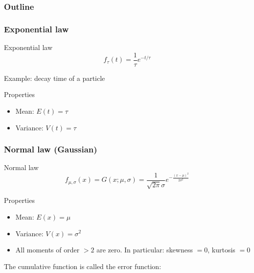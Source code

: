 \documentclass[9pt]{beamer}
\newif\ifmynote
\newcommand\mynote[1]{%
\ifmynote \textbf{#1} \else \fi
}
\begin{document}
\begin{frame}
 \frametitle{Outline}
 
 \tableofcontents[current]
\end{frame}

\begin{frame}
 \frametitle{Exponential law}
 
 \mynote{Écrire au tableau}
 
 \begin{block}{Exponential law}
  $$f_\tau (t) = \frac{1}{\tau} e^{-t/\tau}$$
 \end{block}
 
 Example: decay time of a particle
 
 \begin{block}{Properties}
  \begin{itemize}
   \item Mean: $E(t) = \tau$
   \item Variance: $V(t) = \tau$
  \end{itemize}

 \end{block}


\end{frame}

\begin{frame}
 \frametitle{Normal law (Gaussian)}
 
 \mynote{Écrire au tableau}
 
 \begin{block}{Normal law}
  $$f_{\mu,\sigma} (x) = G(x;\mu,\sigma) =  \frac{1}{\sqrt{2\pi} \sigma} e^{-\frac{(x-\mu)^2}{2\sigma^2}}$$
 \end{block}
 
 \begin{block}{Properties}
  \begin{itemize}
   \item Mean: $E(x) = \mu$
   \item Variance: $V(x) = \sigma^2$
   \item All moments of order $>2$ are zero. In particular: skewness $=0$, kurtosis $=0$
  \end{itemize}
 \end{block}

 The cumulative function is called the error function: 

\end{frame}
\end{document}
